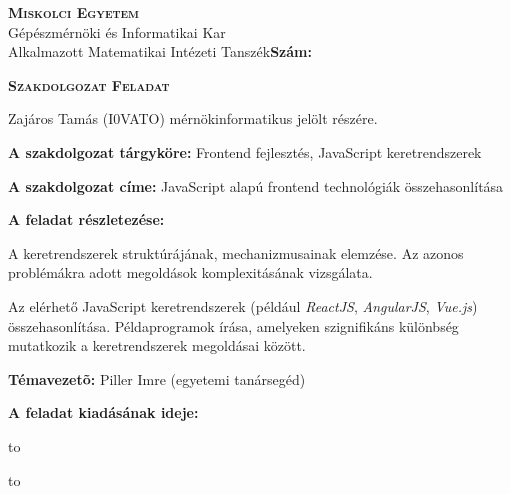 \begin{flushleft}
\textsc{\bfseries Miskolci Egyetem}\\
Gépészmérnöki és Informatikai Kar\\
Alkalmazott Matematikai Intézeti Tanszék\hspace*{4cm}\hfil \textbf{Szám:}
\end{flushleft}
\vskip 0.5cm
\begin{center}
\large\textsc{\bfseries Szakdolgozat Feladat}
\end{center}
\vskip 0.5cm
Zajáros Tamás (I0VATO) mérnökinformatikus jelölt részére.\newline

\noindent\textbf{A szakdolgozat tárgyköre:} Frontend fejlesztés, JavaScript keretrendszerek \newline

\noindent\textbf{A szakdolgozat címe:} JavaScript alapú frontend technológiák összehasonlítása\newline

\noindent\textbf{A feladat részletezése:}

\bigskip

A keretrendszerek struktúrájának, mechanizmusainak elemzése. Az azonos problémákra adott megoldások komplexitásának vizsgálata.

\bigskip

Az elérhető JavaScript keretrendszerek (például \textit{ReactJS}, \textit{AngularJS}, \textit{Vue.js}) összehasonlítása. Példaprogramok írása, amelyeken szignifikáns különbség mutatkozik a keretrendszerek megoldásai között.

\vfill

\noindent\textbf{Témavezetõ:} Piller Imre (egyetemi tanársegéd) \newline


\noindent\textbf{A feladat kiadásának ideje:}\newline


\vskip 2cm

\hbox to 

\hbox to 

